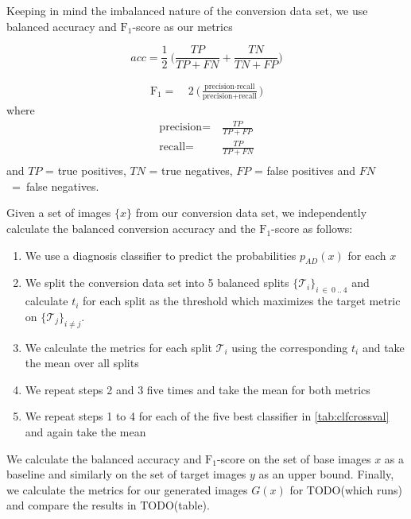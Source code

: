 Keeping in mind the imbalanced nature of the conversion data set, we use balanced accuracy and $\text{F}_1$-score as our metrics

\begin{equation}
	acc = \frac{1}{2}\ \bigg(\frac{TP}{TP + FN} + \frac{TN}{TN + FP}\bigg)
\end{equation}

\begin{equation}
	\begin{split}
		\text{F}_1 =&\ 2\ \bigg(\frac{\text{precision} \cdot \text{recall}}{\text{precision} + \text{recall}}\bigg)
	\end{split}
\end{equation}
where
\begin{equation*}
	\begin{split}
	\text{precision} =& \ \frac{TP}{TP + FP} \\[8pt]
		\text{recall} =& \ \frac{TP}{TP + FN} \\[8pt]
	\end{split}
\end{equation*}
and $TP$ = true positives, $TN$ = true negatives, $FP$ = false positives and $FN$~=~false negatives.

Given a set of images $\{x\}$ from our conversion data set, we independently calculate the balanced conversion accuracy and the $\text{F}_1$-score as follows:
\begin{enumerate}
	\item We use a diagnosis classifier to predict the probabilities $p_{AD}(x)$ for each $x$
	\item We split the conversion data set into 5 balanced splits $\{\mathcal{T}_i\}_{i\ \in\ 0\ ..\ 4}$ and calculate $t_i$ for each split as the threshold which maximizes the target metric on $\{\mathcal{T}_j\}_{i \neq j}$.
	\item We calculate the metrics for each split $\mathcal{T}_i$ using the corresponding $t_i$ and take the mean over all splits
	\item We repeat steps 2 and 3 five times and take the mean for both metrics
	\item We repeat steps 1 to 4 for each of the five best classifier in \autoref{tab:clfcrossval} and again take the mean
\end{enumerate}

We calculate the balanced accuracy and $\text{F}_1$-score on the set of base images $x$ as a baseline and similarly on the set of target images $y$ as an upper bound. Finally, we calculate the metrics for our generated images $G(x)$ for TODO(which runs) and compare the results in TODO(table).


